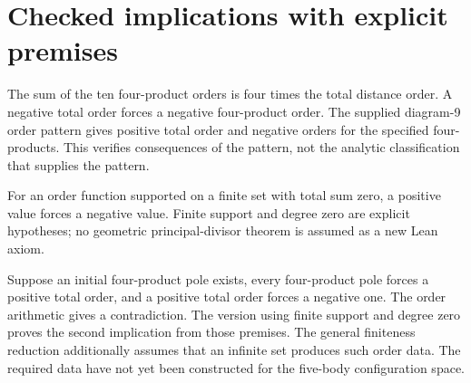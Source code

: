 \chapter{Checked implications with explicit premises}

\begin{lemma}
\label{bp:order-arithmetic}
\leanok
The sum of the ten four-product orders is four times the total distance
order. A negative total order forces a negative four-product order.
The supplied diagram-9 order pattern gives positive total order and negative
orders for the specified four-products. This verifies consequences of the
pattern, not the analytic classification that supplies the pattern.
\end{lemma}

\begin{lemma}
\label{bp:degree-zero-arithmetic}
\leanok
For an order function supported on a finite set with total sum zero, a
positive value forces a negative value. Finite support and degree zero
are explicit hypotheses; no geometric principal-divisor theorem is assumed
as a new Lean axiom.
\end{lemma}

\begin{theorem}
\label{bp:conditional-global}
\leanok
Suppose an initial four-product pole exists, every four-product pole forces
a positive total order, and a positive total order forces a negative one.
The order arithmetic gives a contradiction. The version using finite support
and degree zero proves the second implication from those premises.
The general finiteness reduction additionally assumes that an infinite set
produces such order data. The required data have not yet been constructed
for the five-body configuration space.
\end{theorem}

